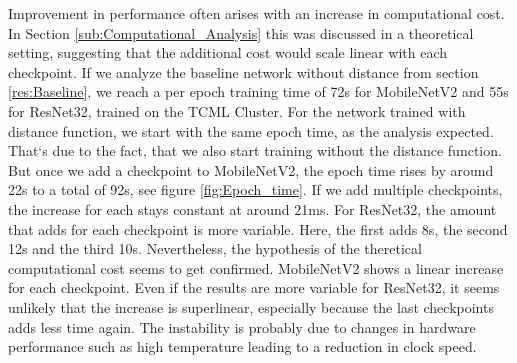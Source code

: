 Improvement in performance often arises with an increase in computational cost.
In Section \ref{sub:Computational_Analysis} this was discussed in a theoretical
setting, suggesting that the additional cost would scale linear with each
checkpoint. If we analyze the baseline network without distance from section
\ref{res:Baseline}, we reach a per epoch training time of 72s for MobileNetV2
and 55s for ResNet32, trained on the TCML Cluster. For the network trained with
distance function, we start with the same epoch time, as the analysis expected.
That`s due to the fact, that we also start training without the distance
function. But once we add a checkpoint to MobileNetV2, the epoch time rises by
around 22s to a total of 92s, see figure \ref{fig:Epoch_time}. If we add
multiple checkpoints, the increase for each stays constant at around 21ms. For
ResNet32, the amount that adds for each checkpoint is more variable. Here, the
first adds 8s, the second 12s and the third 10s. Nevertheless, the hypothesis of
the theretical computational cost seems to get confirmed. MobileNetV2 shows a
linear increase for each checkpoint. Even if the results are more variable for
ResNet32, it seems unlikely that the increase is superlinear, especially because
the last checkpoints adds less time again. The instability is probably due to
changes in hardware performance such as high temperature leading to a reduction
in clock speed.

